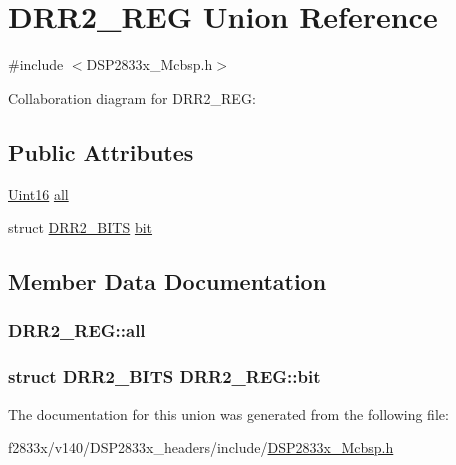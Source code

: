 \hypertarget{union_d_r_r2___r_e_g}{}\section{D\+R\+R2\+\_\+\+R\+E\+G Union Reference}
\label{union_d_r_r2___r_e_g}


{\ttfamily \#include $<$D\+S\+P2833x\+\_\+\+Mcbsp.\+h$>$}



Collaboration diagram for D\+R\+R2\+\_\+\+R\+E\+G\+:
\subsection*{Public Attributes}
\begin{DoxyCompactItemize}
\item 
\hyperlink{_d_s_p2833x___device_8h_a59a9f6be4562c327cbfb4f7e8e18f08b}{Uint16} \hyperlink{union_d_r_r2___r_e_g_a6e4e548a06243d73f5cc3141f28fa374}{all}
\item 
struct \hyperlink{struct_d_r_r2___b_i_t_s}{D\+R\+R2\+\_\+\+B\+I\+T\+S} \hyperlink{union_d_r_r2___r_e_g_a5f70b721f96a1a4e1727b20f37f6d3a1}{bit}
\end{DoxyCompactItemize}


\subsection{Member Data Documentation}
\hypertarget{union_d_r_r2___r_e_g_a6e4e548a06243d73f5cc3141f28fa374}{}
\subsubsection[{all}]{ D\+R\+R2\+\_\+\+R\+E\+G\+::all}\label{union_d_r_r2___r_e_g_a6e4e548a06243d73f5cc3141f28fa374}
\hypertarget{union_d_r_r2___r_e_g_a5f70b721f96a1a4e1727b20f37f6d3a1}{}
\subsubsection[{bit}]{\setlength{\rightskip}{0pt plus 5cm}struct {\bf D\+R\+R2\+\_\+\+B\+I\+T\+S} D\+R\+R2\+\_\+\+R\+E\+G\+::bit}\label{union_d_r_r2___r_e_g_a5f70b721f96a1a4e1727b20f37f6d3a1}


The documentation for this union was generated from the following file\+:\begin{DoxyCompactItemize}
\item 
f2833x/v140/\+D\+S\+P2833x\+\_\+headers/include/\hyperlink{_d_s_p2833x___mcbsp_8h}{D\+S\+P2833x\+\_\+\+Mcbsp.\+h}\end{DoxyCompactItemize}
